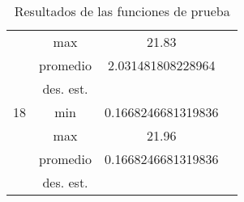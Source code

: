 \documentclass{report}
\begin{document}
\begin{table}[ht]
\begin{tabular}{|c|c|c|c|}
                              & max                         &       21.83     &        \\ \cline{2-4} 
                              & promedio                    &        2.031481808228964    &        \\ \cline{2-4} 
                              & des. est.                   &            &        \\ \hline
        18                    & min                         &     0.1668246681319836       &        \\ \cline{2-4} 
                              & max                         &      21.96      &        \\ \cline{2-4} 
                              & promedio                    &      0.1668246681319836      &        \\ \cline{2-4} 
                              & des. est.                   &            &        \\ \hline

        \end{tabular}
        \caption{Resultados de las funciones de prueba}
        \label{tab:resultados}
    \end{table}
        

        
\end{document}
